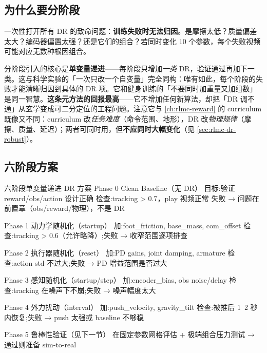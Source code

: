 \subsection{为什么要分阶段}
\label{sec:rlmc-dr-phased-why}

一次性打开所有 DR 的致命问题：\textbf{训练失败时无法归因}。是摩擦太低？质量偏差太大？编码器偏置太强？还是它们的组合？若同时变化 $10$ 个参数，每个失败视频可能对应无数种根因组合。

\begin{insight}\label{ins:rlmc-dr-phased}
分阶段引入的核心是\textbf{单变量递进}——每阶段只增加\emph{一类} DR，验证通过再加下一类。这与科学实验的「一次只改一个自变量」完全同构：唯有如此，每个阶段的失败才能清晰归因到具体的 DR 项。它和健身训练的「不要同时加重量又加组数」是同一智慧。\textbf{这条元方法的回报最高}——它不增加任何新算法，却把「DR 调不通」从玄学变成可二分定位的工程问题。注意它与 \cref{ch:rlmc-reward} 的 curriculum 既像又不同：curriculum 改\emph{任务难度}（命令范围、地形），DR 改\emph{物理规律}（摩擦、质量、延迟）；两者可同时用，但\textbf{不应同时大幅变化}（见 \cref{sec:rlmc-dr-robust}）。
\end{insight}

\subsection{六阶段方案}
\label{sec:rlmc-dr-phased-six}

\begin{codebox}{六阶段单变量递进 DR 方案}
Phase 0  Clean Baseline（无 DR）
  目标:验证 reward/obs/action 设计正确
  检查:tracking > 0.7，play 视频正常
  失败 → 问题在前置章（obs/reward/物理），不是 DR

Phase 1  动力学随机化（startup）
  加:foot_friction, base_mass, com_offset
  检查:tracking > 0.6（允许略降）;失败 → 收窄范围逐项排查

Phase 2  执行器随机化（reset）
  加:PD gains, joint damping, armature
  检查:action std 不过大;失败 → PD 增益范围是否过大

Phase 3  感知随机化（startup/step）
  加:encoder_bias, obs noise/delay
  检查:tracking 在噪声下不崩;失败 → 噪声幅度太大

Phase 4  外力扰动（interval）
  加:push_velocity, gravity_tilt
  检查:被推后 1~2 秒内恢复;失败 → push 太强或 baseline 不够稳

Phase 5  鲁棒性验证（见下一节）
  在固定参数网格评估 + 极端组合压力测试 → 通过则准备 sim-to-real
\end{codebox}

